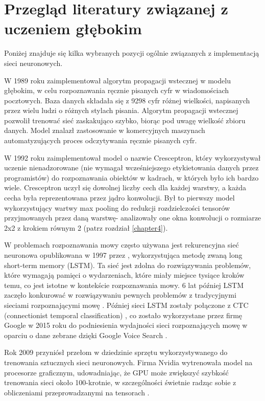 \section{Przegląd literatury związanej z uczeniem głębokim}

Poniżej znajduje się kilka wybranych pozycji ogólnie związanych z implementacją sieci neuronowych.

W 1989 roku \cite{BackpropagationLeCun} zaimplementował algorytm propagacji wstecznej w modelu głębokim, w celu rozpoznawania ręcznie pisanych cyfr w wiadomościach pocztowych. Baza danych składała się z 9298 cyfr różnej wielkości, napisanych przez wielu ludzi o różnych stylach pisania. Algorytm propagacji wstecznej pozwolił trenować sieć zaskakująco szybko, biorąc pod uwagę wielkość zbioru danych. Model znalazł zastosowanie w komercyjnych maszynach automatyzujących proces odczytywania ręcznie pisanych cyfr.

W 1992 roku \cite{Cresceptron} zaimplementował model o nazwie Cresceptron, który wykorzystywał uczenie nienadzorowane (nie wymagał wcześniejszego etykietowania danych przez programistów) do rozpoznawania obiektów w kadrach, w których było ich bardzo wiele. Cresceptron uczył się dowolnej liczby cech dla każdej warstwy, a każda cecha była reprezentowana przez jądro konwolucji. Był to pierwszy model wykorzystujący wartwy max pooling do redukcji rozdzielczości tensorów przyjmowanych przez daną warstwę- analizowały one okna konwolucji o rozmiarze 2x2 z krokiem równym 2 (patrz rozdział \ref{chapter4}). 

W problemach rozpoznawania mowy często używana jest rekurencyjna sieć neuronowa opublikowana w 1997 przez \cite{LSTMSchmidhuber}, wykorzystująca metodę zwaną long short-term memory (LSTM). Ta sieć jest zdolna do rozwiązywania problemów, które wymagają pamięci o wydarzeniach, które miały miejsce tysiące kroków temu, co jest istotne w kontekście rozpoznawania mowy. 6 lat później LSTM zaczęło konkurować w rozwiązywaniu pewnych problemów z tradycyjnymi sieciami rozpoznającymi mowę \cite{LSTMGraves}. Później sieci LSTM zostały połączone z CTC (connectionist temporal classification) \cite{CTC}, co zostało wykorzystane przez firmę Google w 2015 roku do podniesienia wydajności sieci rozpoznających mowę w oparciu o dane zebrane dzięki Google Voice Search \cite{GVS}.

Rok 2009 przyniósł przełom w dziedzinie sprzętu wykorzystywanego do trenowania sztucznych sieci neuronowych. Firma Nvidia wytrenowała model na procesorze graficznym, udowadniając, że GPU może zwiększyć szybkość trenowania sieci około 100-krotnie, w szczególności świetnie radząc sobie z obliczeniami przeprowadzanymi na tensorach \cite{GPUOh}. 
